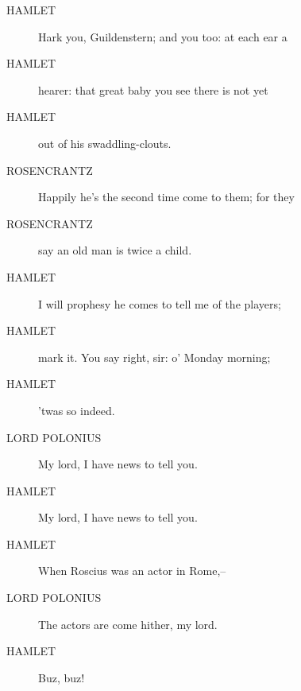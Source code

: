 \documentclass{article}
\begin{document}
\begin{description}
            
\item[HAMLET] Hark you, Guildenstern; and you too: at each ear a
\item[HAMLET] hearer: that great baby you see there is not yet
\item[HAMLET] out of his swaddling-clouts.
\end{description}
          
\begin{description}
            
\item[ROSENCRANTZ] Happily he's the second time come to them; for they
\item[ROSENCRANTZ] say an old man is twice a child.
\end{description}
          
\begin{description}
            
\item[HAMLET] I will prophesy he comes to tell me of the players;
\item[HAMLET] mark it. You say right, sir: o' Monday morning;
\item[HAMLET] 'twas so indeed.
\end{description}
          
\begin{description}
            
\item[LORD POLONIUS] My lord, I have news to tell you.
\end{description}
          
\begin{description}
            
\item[HAMLET] My lord, I have news to tell you.
\item[HAMLET] When Roscius was an actor in Rome,--
\end{description}
          
\begin{description}
            
\item[LORD POLONIUS] The actors are come hither, my lord.
\end{description}
          
\begin{description}
            
\item[HAMLET] Buz, buz!
\end{description}
          
\end{document}
